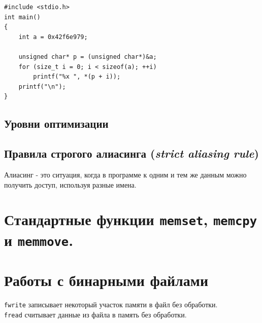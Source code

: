 \documentclass{article}
\begin{document}
\begin{lstlisting} 
#include <stdio.h>
int main() 
{
    int a = 0x42f6e979;
    
    unsigned char* p = (unsigned char*)&a;
    for (size_t i = 0; i < sizeof(a); ++i)
        printf("%x ", *(p + i));
    printf("\n");
}
\end{lstlisting}

\subsection*{Уровни оптимизации}
\newpage
\subsection*{Правила строгого алиасинга (\textit{strict aliasing rule})}
Алиасинг - это ситуация, когда в программе к одним и тем же данным можно получить доступ, 
используя разные имена.    
\newpage
\section*{Стандартные функции \texttt{memset}, \texttt{memcpy} и \texttt{memmove}.}




\newpage
\section*{Работы с бинарными файлами}
\texttt{fwrite} записывает некоторый участок памяти в файл без обработки. \\
\texttt{fread} считывает данные из файла в память без обработки.
\end{document}
